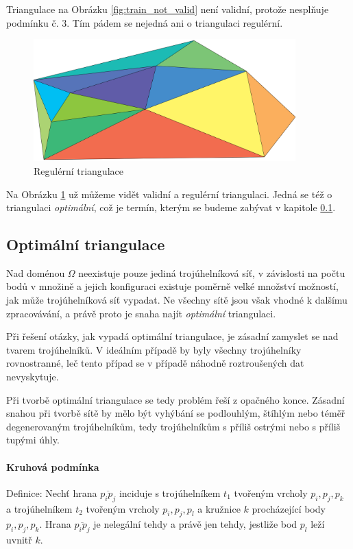 \documentclass[12pt,a4paper]{article}
\begin{document}
\newpage
Triangulace na Obrázku \ref{fig:train_not_valid} není validní, protože nesplňuje podmínku č. 3. Tím pádem se nejedná ani o triangulaci regulérní.

\begin{figure}[h!]
\centering
\includegraphics[width=0.9\textwidth]{img/triangulation.png}
\caption{Regulérní triangulace}
\label{fig:triangulace}
\end{figure}

Na Obrázku \ref{fig:triangulace} už můžeme vidět validní a regulérní triangulaci. Jedná se též o triangulaci \emph{optimální}, což je termín, kterým se budeme zabývat v kapitole \ref{subsec:Optim_trian}.

\newpage
\subsection{Optimální triangulace}
\label{subsec:Optim_trian}

Nad doménou $\Omega$ neexistuje pouze jediná trojúhelníková síť, v závislosti na počtu bodů v množině a jejich konfiguraci existuje poměrně velké množství možností, jak může trojúhelníková síť vypadat. Ne všechny sítě jsou však vhodné k dalšímu zpracovávání, a právě proto je snaha najít \emph{optimální} triangulaci.

Při řešení otázky, jak vypadá optimální triangulace, je zásadní zamyslet se nad tvarem trojúhelníků. V ideálním případě by byly všechny trojúhelníky rovnostranné, leč tento případ se v případě náhodně roztroušených dat nevyskytuje.

Při tvorbě optimální triangulace se tedy problém řeší z opačného konce. Zásadní snahou při tvorbě sítě by mělo být vyhýbání se podlouhlým, štíhlým nebo téměř degenerovaným trojúhelníkům, tedy trojúhelníkům s příliš ostrými nebo s příliš tupými úhly. 

\paragraph{Kruhová podmínka}
Definice:
Nechť hrana $\overline{p_ip_j}$ inciduje s trojúhelníkem $t_1$ tvořeným vrcholy $p_i,p_j,p_k$ a trojúhelníkem $t_2$ tvořeným vrcholy $p_i,p_j,p_l$ a kružnice $k$ procházející body $p_i,p_j,p_k$. Hrana $\overline{p_ip_j}$ je nelegální tehdy a právě jen tehdy, jestliže bod $p_l$ leží uvnitř $k$.
\end{document}
